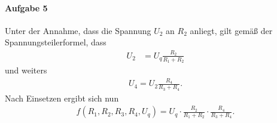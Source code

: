 \documentclass{article}
\begin{document}
\paragraph{Aufgabe 5}

Unter der Annahme, dass die Spannung $U_2$ an $R_2$ anliegt, gilt gemäß der Spannung\-steilerformel, dass
\begin{align*}
    U_2 &= U_q \frac{R_2}{R_1 + R_2}
\end{align*}
und weiters
\begin{align*}
    U_4 = U_2 \frac{R_4}{R_3 + R_4}.
\end{align*}
Nach Einsetzen ergibt sich nun
\begin{align*}
    f(R_1, R_2, R_3, R_4, U_q) = U_q \cdot \frac{R_2}{R_1 + R_2} \cdot \frac{R_4}{R_3 + R_4}.
\end{align*}
\end{document}
